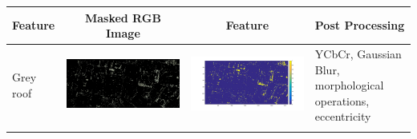 \documentclass[fleqn,10pt]{SelfArx} %
\begin{document}
\begin{table}
\centering
\begin{tabular}{>{\centering\arraybackslash}M{8mm}cc>{\centering\arraybackslash}M{20mm}}
\toprule
Feature & Masked RGB Image & Feature & Post Processing \\ 
\midrule 
\vspace{-3cm}
\hspace{-0.2cm}
Grey roof & \includegraphics[clip,scale=0.07]{19rgb.jpg} & \includegraphics[trim={6cm 2.5cm 4.5cm 1.6cm},clip,scale=0.18]{19.jpg} & \vspace{-3cm}YCbCr, Gaussian Blur, morphological operations, eccentricity \\ 
\midrule 
\vspace{-3cm}
\hspace{-0.4cm}

\end{tabular}
\end{table}
\end{document}
